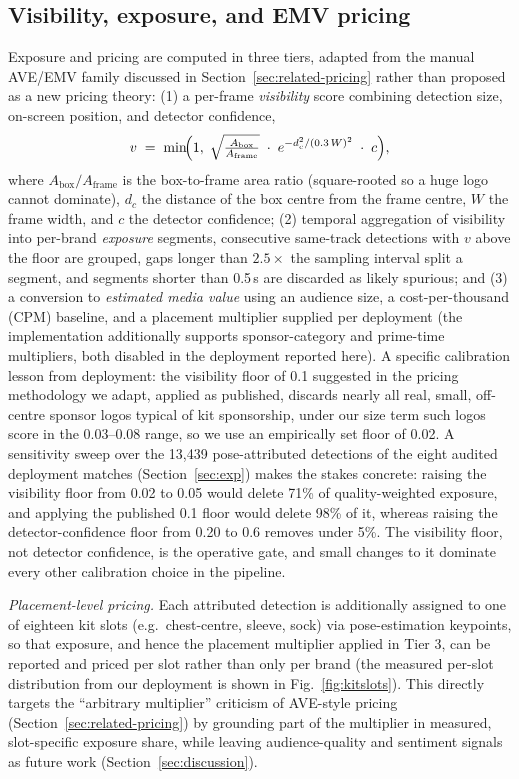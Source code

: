 \documentclass[conference,a4paper]{IEEEtran}
\begin{document}
\subsection{Visibility, exposure, and EMV pricing}
\label{sec:emv}
Exposure and pricing are computed in three tiers, adapted from the manual AVE/EMV family
discussed in Section~\ref{sec:related-pricing} rather than proposed as a new pricing theory:
(1) a per-frame \emph{visibility} score combining detection size, on-screen position,
and detector confidence,
\begin{equation}
v \;=\; \min\!\Bigl(1,\; \sqrt{\tfrac{A_{\text{box}}}{A_{\text{frame}}}}
\;\cdot\; e^{-d_c^2/(0.3\,W)^2} \;\cdot\; c\Bigr),
\label{eq:visibility}
\end{equation}
where $A_{\text{box}}/A_{\text{frame}}$ is the box-to-frame area ratio (square-rooted
so a huge logo cannot dominate), $d_c$ the distance of the box centre from the frame
centre, $W$ the frame width, and $c$ the detector confidence; (2) temporal
aggregation of visibility into per-brand
\emph{exposure} segments, consecutive same-track detections with $v$ above the
floor are grouped, gaps longer than $2.5\times$ the sampling interval split a
segment, and segments shorter than 0.5\,s are discarded as likely spurious; and (3) a
conversion to \emph{estimated media value} using an audience size, a cost-per-thousand
(CPM) baseline, and a placement multiplier supplied per deployment (the implementation
additionally supports sponsor-category and prime-time multipliers, both disabled in the
deployment reported here). A specific
calibration lesson from deployment: the visibility floor of 0.1 suggested in the
pricing methodology we adapt, applied as published, discards nearly all real, small,
off-centre sponsor logos typical of kit sponsorship, under our size term such logos
score in the 0.03--0.08 range, so we use an empirically set floor of 0.02. A
sensitivity sweep over the 13{,}439 pose-attributed detections of the eight audited
deployment matches (Section~\ref{sec:exp}) makes the stakes concrete: raising the
visibility floor from 0.02 to 0.05 would delete 71\% of quality-weighted exposure,
and applying the published 0.1 floor would delete 98\% of it, whereas raising the
detector-confidence floor from 0.20 to 0.6 removes under 5\%. The visibility floor,
not detector confidence, is the operative gate, and small changes to it dominate
every other calibration choice in the pipeline.

\smallskip\noindent\textit{Placement-level pricing.}
Each attributed detection is additionally assigned to one of eighteen kit slots (e.g.\
chest-centre, sleeve, sock) via pose-estimation keypoints, so that exposure, and hence
the placement multiplier applied in Tier 3, can be reported and priced per slot rather
than only per brand (the measured per-slot distribution from our deployment is shown in
Fig.~\ref{fig:kitslots}). This directly targets the ``arbitrary multiplier'' criticism of
AVE-style pricing (Section~\ref{sec:related-pricing}) by grounding part of the multiplier in
measured, slot-specific exposure share, while leaving audience-quality and sentiment
signals as future work (Section~\ref{sec:discussion}).
\end{document}
